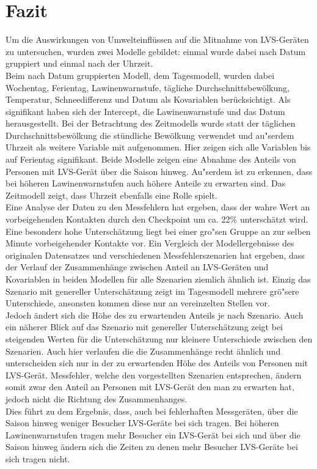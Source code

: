\documentclass[12pt]{scrreprt}
\begin{document}
\chapter{Fazit}
Um die Auswirkungen von Umwelteinflüssen auf die Mitnahme von LVS-Geräten zu untersuchen, wurden zwei Modelle gebildet: einmal wurde dabei nach Datum gruppiert und einmal nach der Uhrzeit. \\
Beim nach Datum gruppierten Modell, dem Tagesmodell, wurden dabei Wochentag, Ferientag, Lawinenwarnstufe, tägliche Durchschnittsbewölkung, Temperatur, Schneedifferenz  und Datum als Kovariablen berücksichtigt.
Als signifikant haben sich der Intercept, die Lawinenwarnstufe und das Datum herausgestellt. Bei der Betrachtung des Zeitmodells wurde statt der täglichen Durchschnittsbewölkung die stündliche Bewölkung verwendet und au"serdem Uhrzeit als weitere Variable mit aufgenommen. Hier zeigen sich alle Variablen bis auf Ferientag signifikant. Beide Modelle zeigen eine Abnahme des Anteils von Personen mit LVS-Gerät über die Saison hinweg. Au"serdem ist zu erkennen, dass bei höheren Lawinenwarnstufen auch höhere Anteile zu erwarten sind. Das Zeitmodell zeigt, dass Uhrzeit ebenfalls eine Rolle spielt. \\
Eine Analyse der Daten zu den Messfehlern hat ergeben, dass der wahre Wert an vorbeigehenden Kontakten durch den Checkpoint um ca. 22\% unterschätzt wird. Eine besonders hohe Unterschätzung liegt bei einer gro"sen Gruppe an zur selben Minute vorbeigehender Kontakte vor. Ein Vergleich der Modellergebnisse des originalen Datensatzes und verschiedenen Messfehlerszenarien hat ergeben, dass der Verlauf der Zusammenhänge zwischen Anteil an LVS-Geräten und Kovariablen in beiden Modellen für alle Szenarien ziemlich ähnlich ist. Einzig das Szenario mit genereller Unterschätzung zeigt im Tagesmodell mehrere grö"sere Unterschiede, ansonsten kommen diese nur an vereinzelten Stellen vor. \\ Jedoch ändert sich die Höhe des zu erwartenden Anteils je nach Szenario. Auch ein näherer Blick auf das Szenario mit genereller Unterschätzung zeigt bei steigenden Werten für die Unterschätzung nur kleinere Unterschiede zwischen den Szenarien. Auch hier verlaufen die die Zusammenhänge recht ähnlich und unterscheiden sich nur in der zu erwartenden Höhe des Anteils von Personen mit LVS-Gerät. Messfehler, welche den vorgestellten Szenarien entsprechen, ändern somit zwar den Anteil an Personen mit LVS-Gerät den man zu erwarten hat, jedoch nicht die Richtung des Zusammenhanges. \\
Dies führt zu dem Ergebnis, dass, auch bei fehlerhaften Messgeräten, über die Saison hinweg weniger Besucher LVS-Geräte bei sich tragen. Bei höheren Lawinenwarnstufen tragen mehr Besucher ein LVS-Gerät bei sich und über die Saison hinweg ändern sich die Zeiten zu denen mehr Besucher LVS-Geräte bei sich tragen nicht.
\end{document}
